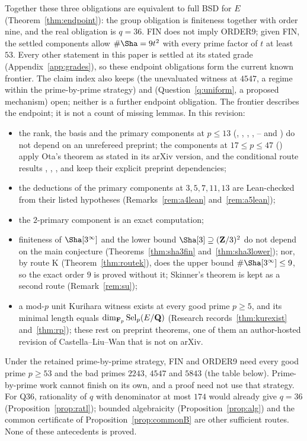 Together these three obligations are equivalent to full BSD for $E$ (Theorem~\ref{thm:endpoint}): the group obligation is finiteness together with order nine, and the real obligation is $q=36$. FIN does not imply ORDER9; given FIN, the settled components allow $\#\Sha=9t^2$ with every prime factor of $t$ at least $53$. Every other statement in this paper is settled at its stated grade (Appendix~\ref{app:grades}), so these endpoint obligations form the current known frontier. The claim index also keeps  (the unevaluated witness at $4547$, a regime within the prime-by-prime strategy) and  (Question~\ref{q:uniform}, a proposed mechanism) open; neither is a further endpoint obligation. The frontier describes the endpoint; it is not a count of missing lemmas. In this revision:
\begin{itemize}[leftmargin=*]
\item the rank, the basis and the primary components at $p\le13$ (, , , , -- and ) do not depend on an unrefereed preprint; the components at $17\le p\le47$ () apply Ota's theorem as stated in its arXiv version, and the conditional route results , , ,  and  keep their explicit preprint dependencies;
\item the deductions of the primary components at $3,5,7,11,13$ are Lean-checked from their listed hypotheses (Remarks~\ref{rem:a4lean} and~\ref{rem:a5lean});
\item the $2$-primary component is an exact computation;
\item finiteness of $\Sha[3^\infty]$ and the lower bound $\Sha[3]\supseteq(\Z/3)^2$ do not depend on the main conjecture (Theorems~\ref{thm:sha3fin} and~\ref{thm:sha3lower}); nor, by route K (Theorem~\ref{thm:routek}), does the upper bound $\#\Sha[3^\infty]\le9$, so the exact order $9$ is proved without it; Skinner's theorem is kept as a second route (Remark~\ref{rem:su});
\item a mod-$p$ unit Kurihara witness exists at every good prime $p\ge5$, and its minimal length equals $\dim_{\mathbf{F}_p}\operatorname{Sel}_p(E/\mathbf{Q})$ (Research records~\ref{thm:kurexist} and~\ref{thm:rp}); these rest on preprint theorems, one of them an author-hosted revision of Castella--Liu--Wan \cite{clw} that is not on arXiv.
\end{itemize}
Under the retained prime-by-prime strategy, FIN and ORDER9 need every good prime $p\ge53$ and the bad primes $2243$, $4547$ and $5843$ (the table below). Prime-by-prime work cannot finish on its own, and a proof need not use that strategy. For Q36, rationality of $q$ with denominator at most $174$ would already give $q=36$ (Proposition~\ref{prop:ratl}); bounded algebraicity (Proposition~\ref{prop:alg}) and the common certificate of Proposition~\ref{prop:commonB} are other sufficient routes. None of these antecedents is proved.


